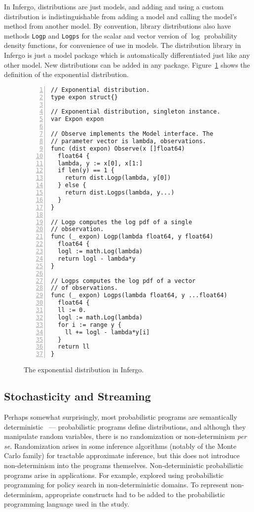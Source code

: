 \documentclass[sigplan,review,10pt,anonymous]{acmart}
\begin{document}
\begin{sloppypar}
In Infergo, distributions are just models, and adding and using
a custom distribution is indistinguishable from adding a model
and calling the model's method from another model. By
convention, library distributions also have methods
\lstinline{Logp} and \lstinline{Logps} for the scalar and vector
version of $\log$ probability density functions, for convenience
of use in models. The distribution library in Infergo is just a
model package which is automatically differentiated just like
any other model. New distributions can be added in any package.
Figure~\ref{fig:exponential-distribution} shows the definition of the
exponential distribution.
\begin{figure}
  \begin{lstlisting}[framexleftmargin=10pt,numbers=left]
// Exponential distribution.
type expon struct{}

// Exponential distribution, singleton instance.
var Expon expon

// Observe implements the Model interface. The
// parameter vector is lambda, observations.
func (dist expon) Observe(x []float64)
  float64 {
  lambda, y := x[0], x[1:]
  if len(y) == 1 {
    return dist.Logp(lambda, y[0])
  } else {
    return dist.Logps(lambda, y...)
  }
}

// Logp computes the log pdf of a single
// observation.
func (_ expon) Logp(lambda float64, y float64)
  float64 {
  logl := math.Log(lambda)
  return logl - lambda*y
}

// Logps computes the log pdf of a vector
// of observations.
func (_ expon) Logps(lambda float64, y ...float64)
  float64 {
  ll := 0.
  logl := math.Log(lambda)
  for i := range y {
    ll += logl - lambda*y[i]
  }
  return ll
}
  \end{lstlisting}
  \caption{The exponential distribution in Infergo.}
  \label{fig:exponential-distribution}
\end{figure}

\subsection{Stochasticity and Streaming}

Perhaps somewhat surprisingly, most probabilistic programs are
semantically deterministic~\cite{SYW+16} --- probabilistic programs
define distributions, and although they manipulate random
variables, there is no randomization or non-determinism
\textit{per se}. Randomization arises in some inference
algorithms (notably of the Monte Carlo family) for tractable
approximate inference, but this does not introduce
non-determinism into the programs themselves. Non-deterministic
probabilistic programs arise in applications. For example,
\citet{MPT+16} explored using probabilistic programming for
policy search in non-deterministic domains. To represent
non-determinism, appropriate constructs had to be added to the
probabilistic programming language used in the study.


\end{sloppypar}
\end{document}
